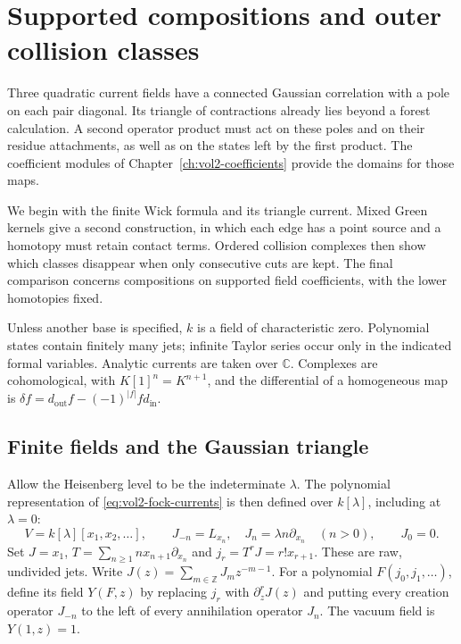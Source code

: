 \chapter{Supported compositions and outer collision classes}
\label{ch:vol2-supported-compositions}

Three quadratic current fields have a connected Gaussian correlation
with a pole on each pair diagonal. Its triangle of contractions already
lies beyond a forest calculation. A second operator product must act on
these poles and on their residue attachments, as well as on the states
left by the first product. The coefficient modules of
Chapter~\ref{ch:vol2-coefficients} provide the domains for those maps.

We begin with the finite Wick formula and its triangle current. Mixed
Green kernels give a second construction, in which each edge has a point
source and a homotopy must retain contact terms. Ordered collision
complexes then show which classes disappear when only consecutive
cuts are kept. The final comparison concerns compositions on supported
field coefficients, with the lower homotopies fixed.

Unless another base is specified, $k$ is a field of characteristic
zero. Polynomial states contain finitely many jets; infinite Taylor
series occur only in the indicated formal variables. Analytic currents
are taken over $\mathbb C$. Complexes are cohomological, with
$K[1]^n=K^{n+1}$, and the differential of a homogeneous map is
$\delta f=d_{\mathrm{out}}f-(-1)^{|f|}fd_{\mathrm{in}}$.

\section{Finite fields and the Gaussian triangle}
\label{sec:vol2-wick-fields}

Allow the Heisenberg level to be the indeterminate $\lambda$. The
polynomial representation of \eqref{eq:vol2-fock-currents} is then
defined over $k[\lambda]$, including at $\lambda=0$:
\[
 V=k[\lambda][x_1,x_2,\ldots],\qquad
 J_{-n}=L_{x_n},\quad J_n=\lambda n\partial_{x_n}\quad(n>0),
 \qquad J_0=0.
\]
Set $J=x_1$, $T=\sum_{n\geq1}n x_{n+1}\partial_{x_n}$ and
$j_r=T^rJ=r!x_{r+1}$. These are raw, undivided jets.
Write $J(z)=\sum_{m\in\mathbb Z}J_mz^{-m-1}$.
For a polynomial $F(j_0,j_1,\ldots)$, define its field $Y(F,z)$
by replacing $j_r$ with $\partial_z^rJ(z)$ and putting every
creation operator $J_{-n}$ to the left of every annihilation
operator $J_n$. The vacuum field is $Y(1,z)=1$.

